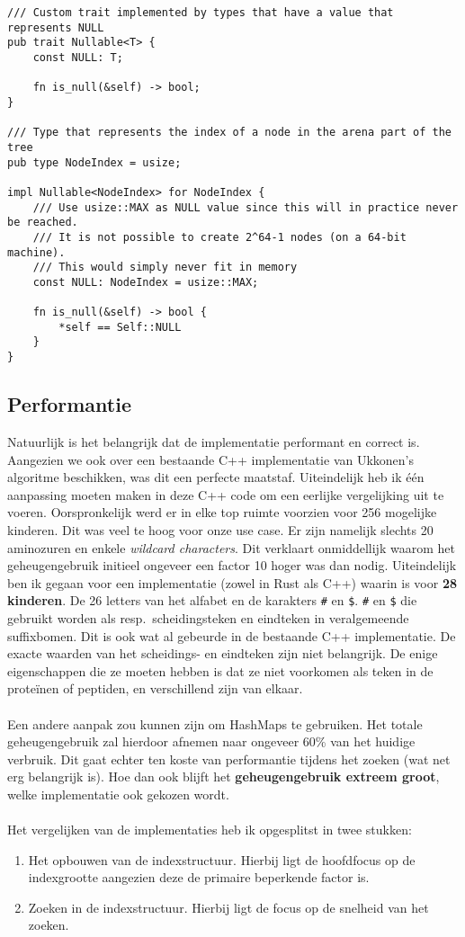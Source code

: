 \begin{verbatim}
/// Custom trait implemented by types that have a value that represents NULL
pub trait Nullable<T> {
    const NULL: T;

    fn is_null(&self) -> bool;
}

/// Type that represents the index of a node in the arena part of the tree
pub type NodeIndex = usize;

impl Nullable<NodeIndex> for NodeIndex {
    /// Use usize::MAX as NULL value since this will in practice never be reached.
    /// It is not possible to create 2^64-1 nodes (on a 64-bit machine).
    /// This would simply never fit in memory
    const NULL: NodeIndex = usize::MAX;

    fn is_null(&self) -> bool {
        *self == Self::NULL
    }
}
\end{verbatim}

\subsection{Performantie}\label{subsec:performantie}
Natuurlijk is het belangrijk dat de implementatie performant en correct is.
Aangezien we ook over een bestaande C++ implementatie van Ukkonen's algoritme beschikken, was dit een perfecte maatstaf.
Uiteindelijk heb ik één aanpassing moeten maken in deze C++ code om een eerlijke vergelijking uit te voeren.
Oorspronkelijk werd er in elke top ruimte voorzien voor 256 mogelijke kinderen.
Dit was veel te hoog voor onze use case.
Er zijn namelijk slechts 20 aminozuren en enkele \textit{wildcard characters}.
Dit verklaart onmiddellijk waarom het geheugengebruik initieel ongeveer een factor 10 hoger was dan nodig.
Uiteindelijk ben ik gegaan voor een implementatie (zowel in Rust als C++) waarin is voor \textbf{28 kinderen}.
De 26 letters van het alfabet en de karakters \texttt{\#} en \texttt{\$}.
\texttt{\#} en \texttt{\$} die gebruikt worden als resp.~scheidingsteken en eindteken in veralgemeende suffixbomen.
Dit is ook wat al gebeurde in de bestaande C++ implementatie.
De exacte waarden van het scheidings- en eindteken zijn niet belangrijk.
De enige eigenschappen die ze moeten hebben is dat ze niet voorkomen als teken in de proteïnen of peptiden, en verschillend zijn van elkaar.
\\ \\
Een andere aanpak zou kunnen zijn om HashMaps te gebruiken.
Het totale geheugengebruik zal hierdoor afnemen naar ongeveer 60\% van het huidige verbruik.
Dit gaat echter ten koste van performantie tijdens het zoeken (wat net erg belangrijk is).
Hoe dan ook blijft het \textbf{geheugengebruik extreem groot}, welke implementatie ook gekozen wordt.
\\ \\
Het vergelijken van de implementaties heb ik opgesplitst in twee stukken:
\begin{enumerate}
    \item Het opbouwen van de indexstructuur.
    Hierbij ligt de hoofdfocus op de indexgrootte aangezien deze de primaire beperkende factor is.
    \item Zoeken in de indexstructuur.
    Hierbij ligt de focus op de snelheid van het zoeken.
\end{enumerate}

